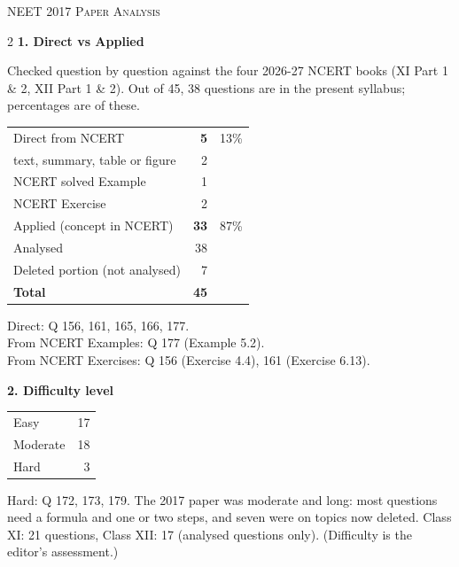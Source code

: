 \clearpage
\begin{center}{}\par
{\fontsize{20}{24}\selectfont\color{navy}\scshape NEET 2017 \textperiodcentered{} Paper Analysis}\par
{\color{gilt}}\end{center}
\vspace{4pt}
\begin{multicols}{2}
\textbf{\color{crimson}1. Direct vs Applied}\par\smallskip
{\footnotesize Checked question by question against the four 2026-27 NCERT books (XI Part 1 \& 2, XII Part 1 \& 2). Out of 45, 38 questions are in the present syllabus; percentages are of these.}\par\smallskip
\begin{tabular}{@{}lrr@{}}\toprule
Direct from NCERT & \textbf{5} & 13\%\\
\quad text, summary, table or figure & 2 &\\
\quad NCERT solved Example & 1 &\\
\quad NCERT Exercise & 2 &\\
Applied (concept in NCERT) & \textbf{33} & 87\%\\\midrule
Analysed & 38 &\\
Deleted portion (not analysed) & 7 &\\\midrule
\textbf{Total} & \textbf{45} &\\\bottomrule\end{tabular}\par\smallskip
{\footnotesize Direct: Q 156, 161, 165, 166, 177.\\ From NCERT Examples: Q 177 (Example 5.2).\\ From NCERT Exercises: Q 156 (Exercise 4.4), 161 (Exercise 6.13).}\par\medskip
\textbf{\color{crimson}2. Difficulty level}\par\smallskip
\begin{tabular}{@{}lr@{}}\toprule
Easy & 17\\ Moderate & 18\\ Hard & 3\\\bottomrule\end{tabular}\par\smallskip
{\footnotesize Hard: Q 172, 173, 179. The 2017 paper was moderate and long: most questions need a formula and one or two steps, and seven were on topics now deleted. Class XI: 21 questions, Class XII: 17 (analysed questions only). (Difficulty is the editor's assessment.)}\par\medskip

\end{multicols}
